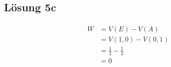 \documentclass[main.tex]{subfiles}
\begin{document}
\subsection{Lösung 5c}
\begin{align*}
    \begin{array}{rl}
        W & =V(E)-V(A)\\
        & = V(1, 0) - V(0, 1)\\[2mm]
        & = \frac{1}{3} - \frac{1}{3}\\[2mm]
        & = 0
    \end{array}
\end{align*}
\end{document}

